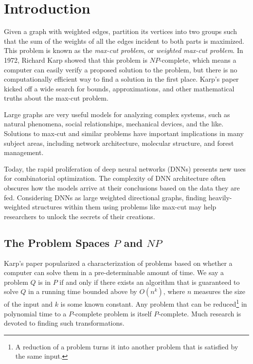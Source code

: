 
\section{Introduction}

\par Given a graph with weighted edges, partition its vertices into two groups such that the sum of the weights of all the edges incident to both parts is maximized. This problem is known as the \textit{max-cut problem}, or \textit{weighted max-cut problem}. In 1972, Richard Karp showed that this problem is $NP$-complete, which means a computer can easily verify a proposed solution to the problem, but there is no computationally efficient way to find a solution in the first place.\cite{Karp} Karp's paper kicked off a wide search for bounds, approximations, and other mathematical truths about the max-cut problem. \\

\par Large graphs are very useful models for analyzing complex systems, such as natural phenomena, social relationships, mechanical devices, and the like.  Solutions to max-cut and similar problems have important implications in many subject areas, including network architecture, molecular structure, and forest management. \\

\par Today, the rapid proliferation of deep neural networks (DNNs) presents new uses for combinatorial optimization. The complexity of DNN architecture often obscures how the models arrive at their conclusions based on the data they are fed. Considering DNNs as large weighted directional graphs, finding heavily-weighted structures within them using problems like max-cut may help researchers to unlock the secrets of their creations. \\

\subsection{The Problem Spaces $P$ and $NP$}

\par Karp's paper popularized a characterization of problems based on whether a computer can solve them in a pre-determinable amount of time.\cite{Karp} We say a problem $Q$ is in $P$ if and only if there exists an algorithm that is guaranteed to solve $Q$ in a running time bounded above by $O(n^k)$, where $n$ measures the size of the input and $k$ is some known constant. Any problem that can be reduced\footnote{A reduction of a problem turns it into another problem that is satisfied by the same input.} in polynomial time to a $P$-complete problem is itself $P$-complete. Much research is devoted to finding such transformations. \\

